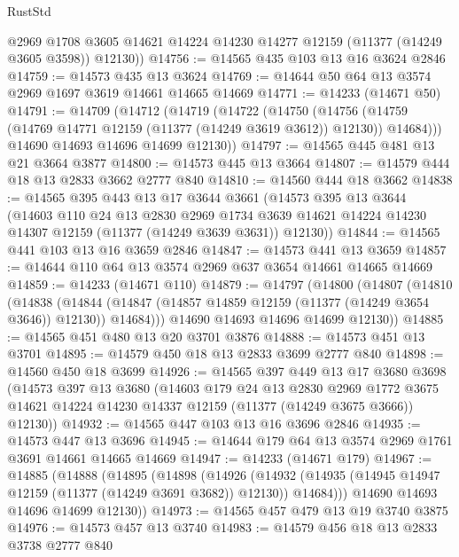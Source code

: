 \begin{lexlean}{RustStd}
\begin{coremodule}
{\begin{coremodule}
{{{{{{{{{{{{{{{{{{{{{{{{{{{{{{{{{        @2969
        @1708
        @3605
        @14621
        @14224
        @14230
        @14277
        @12159
        (@11377 (@14249 @3605 @3598))
        @12130))
@14756 := @14565 @435 @103 @13 @16 @3624 @2846
@14759 := @14573 @435 @13 @3624
@14769 := @14644 @50 @64 @13 @3574 @2969 @1697 @3619 @14661 @14665 @14669
@14771 := @14233 (@14671 @50)
@14791 := @14709
    (@14712
      (@14719
        (@14722
          (@14750
            (@14756 (@14759 (@14769 @14771 @12159 (@11377 (@14249 @3619 @3612)) @12130)) @14684)))
        @14690
        @14693
        @14696
        @14699
        @12130))
@14797 := @14565 @445 @481 @13 @21 @3664 @3877
@14800 := @14573 @445 @13 @3664
@14807 := @14579 @444 @18 @13 @2833 @3662 @2777 @840
@14810 := @14560 @444 @18 @3662
@14838 := @14565
    @395
    @443
    @13
    @17
    @3644
    @3661
    (@14573
      @395
      @13
      @3644
      (@14603
        @110
        @24
        @13
        @2830
        @2969
        @1734
        @3639
        @14621
        @14224
        @14230
        @14307
        @12159
        (@11377 (@14249 @3639 @3631))
        @12130))
@14844 := @14565 @441 @103 @13 @16 @3659 @2846
@14847 := @14573 @441 @13 @3659
@14857 := @14644 @110 @64 @13 @3574 @2969 @637 @3654 @14661 @14665 @14669
@14859 := @14233 (@14671 @110)
@14879 := @14797
    (@14800
      (@14807
        (@14810
          (@14838
            (@14844 (@14847 (@14857 @14859 @12159 (@11377 (@14249 @3654 @3646)) @12130)) @14684)))
        @14690
        @14693
        @14696
        @14699
        @12130))
@14885 := @14565 @451 @480 @13 @20 @3701 @3876
@14888 := @14573 @451 @13 @3701
@14895 := @14579 @450 @18 @13 @2833 @3699 @2777 @840
@14898 := @14560 @450 @18 @3699
@14926 := @14565
    @397
    @449
    @13
    @17
    @3680
    @3698
    (@14573
      @397
      @13
      @3680
      (@14603
        @179
        @24
        @13
        @2830
        @2969
        @1772
        @3675
        @14621
        @14224
        @14230
        @14337
        @12159
        (@11377 (@14249 @3675 @3666))
        @12130))
@14932 := @14565 @447 @103 @13 @16 @3696 @2846
@14935 := @14573 @447 @13 @3696
@14945 := @14644 @179 @64 @13 @3574 @2969 @1761 @3691 @14661 @14665 @14669
@14947 := @14233 (@14671 @179)
@14967 := @14885
    (@14888
      (@14895
        (@14898
          (@14926
            (@14932 (@14935 (@14945 @14947 @12159 (@11377 (@14249 @3691 @3682)) @12130)) @14684)))
        @14690
        @14693
        @14696
        @14699
        @12130))
@14973 := @14565 @457 @479 @13 @19 @3740 @3875
@14976 := @14573 @457 @13 @3740
@14983 := @14579 @456 @18 @13 @2833 @3738 @2777 @840
}}}}}}}}}}}}}}}}}}}}}}}}}}}}}}}}}
\end{coremodule}}
\end{coremodule}
\end{lexlean}
